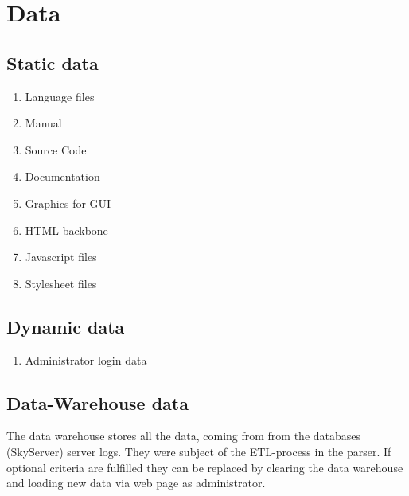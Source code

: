 \section{Data}
\renewcommand{\theenumi}{/D\arabic{enumi}0/}
\renewcommand{\labelenumi}{\theenumi}

\subsection{Static data}

\begin{enumerate}
  \item Language files
  \item Manual
  \item Source Code
  \item Documentation
  \item Graphics for GUI
  \item HTML backbone
  \item Javascript files
  \item Stylesheet files
\end{enumerate}

\subsection{Dynamic data}

\begin{enumerate}[resume]
  \item Administrator login data
\end{enumerate}


\newpage
\subsection{Data-Warehouse data} \label{WHschema}


The \gls{data warehouse} stores all the data, coming from from the \glspl{database} (\gls{SkyServer}) server logs.
They were subject of the \gls{ETL-process} in the parser. If optional criteria are fulfilled
 they can be replaced by clearing the \gls{data warehouse} 
 and loading new data via web page as administrator.

